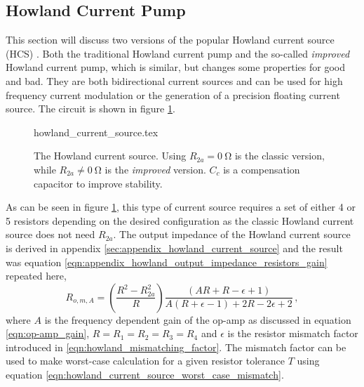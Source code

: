 \clearpage
\subsection{Howland Current Pump}%
\label{sec:howland_current_source}
This section will discuss two versions of the popular Howland current source (HCS) \cite{howland_current_source}. Both the traditional Howland current pump and the so-called \textit{improved} Howland current pump, which is similar, but changes some properties for good and bad. They are both bidirectional current sources and can be used for high frequency current modulation or the generation of a precision floating current source. The circuit is shown in figure \ref{fig:howland_current_source}.
\begin{figure}[ht]
    \centering
        {howland_current_source.tex}
    \caption{The Howland current source. Using $R_{2a} = \qty{0}{\ohm}$ is the classic version, while $R_{2a} \neq \qty{0}{\ohm}$ is the \textit{improved} version. $C_c$ is a compensation capacitor to improve stability.}
    \label{fig:howland_current_source}
\end{figure}

As can be seen in figure \ref{fig:howland_current_source}, this type of current source requires a set of either \num{4} or \num{5} resistors depending on the desired configuration as the classic Howland current source does not need $R_{2a}$. The output impedance of the Howland current source is derived in appendix \ref{sec:appendix_howland_current_source} and the result was equation \ref{eqn:appendix_howland_output_impedance_resistors_gain} repeated here,
\begin{equation}
    R_{o,m,A} = \left(\frac{R^2 - R_{2a}^2}{R}\right) \frac{\left(A R + R - \epsilon + 1\right)}{A \left(R + \epsilon - 1\right) + 2 R - 2 \epsilon + 2}\,,\label{eqn:howland_output_impedance_resistors_gain}
\end{equation}
where $A$ is the frequency dependent gain of the op-amp as discussed in equation \ref{eqn:op-amp_gain}, $R = R_1 = R_2 = R_3 = R_4$ and $\epsilon$ is the resistor mismatch factor introduced in \ref{eqn:howland_mismatching_factor}. The mismatch factor can be used to make worst-case calculation for a given resistor tolerance $T$ using equation \ref{eqn:howland_current_source_worst_case_mismatch}.

